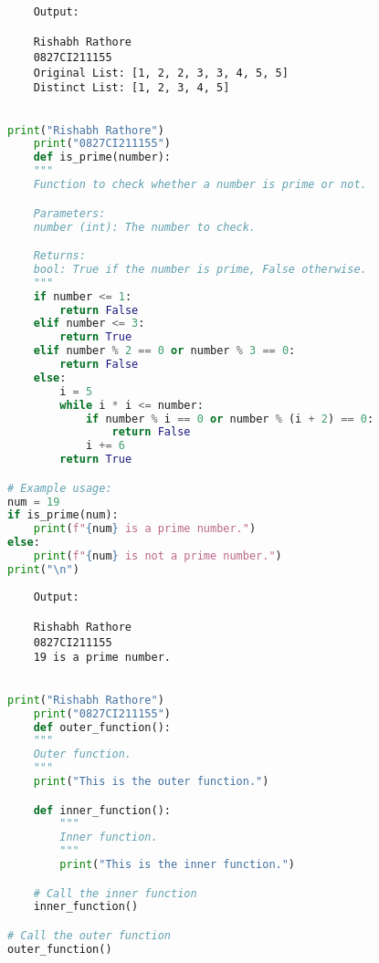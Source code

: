 \documentclass{report}
\begin{document}
\begin{verbatim}
	Output:

	Rishabh Rathore
	0827CI211155
	Original List: [1, 2, 2, 3, 3, 4, 5, 5]
	Distinct List: [1, 2, 3, 4, 5]


\end{verbatim}

\newpage


\sol 
\begin{lstlisting}[language=Python]
	print("Rishabh Rathore")
	print("0827CI211155")
	def is_prime(number):
    """
    Function to check whether a number is prime or not.

    Parameters:
    number (int): The number to check.

    Returns:
    bool: True if the number is prime, False otherwise.
    """
    if number <= 1:
        return False
    elif number <= 3:
        return True
    elif number % 2 == 0 or number % 3 == 0:
        return False
    else:
        i = 5
        while i * i <= number:
            if number % i == 0 or number % (i + 2) == 0:
                return False
            i += 6
        return True

# Example usage:
num = 19
if is_prime(num):
    print(f"{num} is a prime number.")
else:
    print(f"{num} is not a prime number.")
print("\n")
\end{lstlisting}

\begin{verbatim}
	Output:

	Rishabh Rathore
	0827CI211155
	19 is a prime number.
	

\end{verbatim}

\newpage


\sol 
\begin{lstlisting}[language=Python]
	print("Rishabh Rathore")
	print("0827CI211155")
	def outer_function():
    """
    Outer function.
    """
    print("This is the outer function.")

    def inner_function():
        """
        Inner function.
        """
        print("This is the inner function.")

    # Call the inner function
    inner_function()

# Call the outer function
outer_function()
  

\end{lstlisting}
\end{document}
